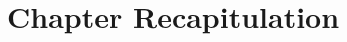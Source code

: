 \documentclass[thesis-solanki.tex]{subfiles}
\begin{document}

\section{Chapter Recapitulation}

\ifMain
\begin{scope}
  \nolinenumbers
  \enotesize
  \par
  \begin{singlespace}
  \setlength{\parskip}{12pt plus 2pt minus 1pt}
  \theendnotes
  \par
  \end{singlespace}
\end{scope}
\fi
\end{document}

